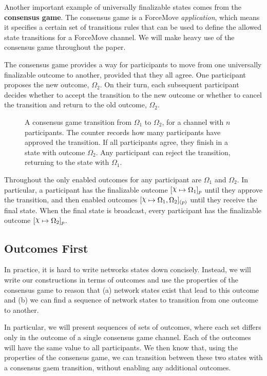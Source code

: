 Another important example of universally finalizable states comes from the \textbf{consensus game}.
The consensus game is a ForceMove \textit{application}, which means it specifies a certain
set of transitions rules that can be used to define the allowed state transitions for a ForceMove channel.
We will make heavy use of the consensus game throughout the paper.

The consensus game provides a way for participants to move from one universally finalizable outcome to another, provided that they all agree.
One participant proposes the new outcome, $\Omega_2$.
On their turn, each subsequent participant decides whether to accept the transition to the new outcome or whether to cancel the transition and return to the old outcome, $\Omega_2$.
\begin{figure}[h]\centering
  \makebox[\textwidth][c]{}
  \caption{
    A consensus game transition from $\Omega_1$ to $\Omega_2$, for a channel with $n$ participants.
    The counter records how many participants have approved the transition.
    If all participants agree, they finish in a state with outcome $\Omega_2$.
    Any participant can reject the transition, returning to the state with $\Omega_1$.
  }
\end{figure}

Throughout the only enabled outcomes for any participant are $\Omega_1$ and $\Omega_2$.
In particular, a participant has the finalizable outcome $\finalizable{\rchi}{\Omega_1}{p}$ until they approve the transition, and then enabled outcomes $\finalizable{\rchi}{\Omega_1, \Omega_2}{(p)}$ until they receive the final state.
When the final state is broadcast, every participant has the finalizable outcome $\finalizable{\rchi}{\Omega_2}{p}$.

\subsection{Outcomes First}

In practice, it is hard to write networks states down concisely.
Instead, we will write our constructions in terms of outcomes and use the properties of the consensus game to reason that (a) network states exist that lead to this outcome and (b) we can find a sequence of network states to transition from one outcome to another.

In particular, we will present sequences of sets of outcomes, where each set differs only in the outcome of a single consensus game channel.
Each of the outcomes will have the same value to all participants.
We then know that, using the properties of the consensus game, we can transition between these two states with a consensus gaem transition, without enabling any additional outcomes.

